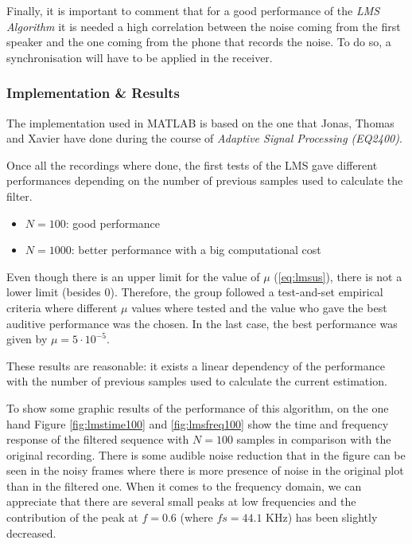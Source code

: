 \documentclass[11pt,a4paper,english]{book}  %
\theoremstyle{definition}  %
\theoremstyle{plain}  %
\theoremstyle{remark}  %
\begin{document}
		Finally, it is important to comment that for a good performance of the \textit{LMS Algorithm} it is needed a high correlation between the noise coming from the first speaker and the one coming from the phone that records the noise. To do so, a synchronisation will have to be applied in the receiver.
		
	
	\subsubsection{Implementation \& Results}
	
	The implementation used in MATLAB is based on the one that Jonas, Thomas and Xavier have done during the course of \textit{Adaptive Signal Processing (EQ2400)}.
	
	Once all the recordings where done, the first tests of the LMS gave different performances depending on the number of previous samples used to calculate the filter.
	
	\begin{itemize}
	\item $N=100$: good performance
	\item $N=1000$: better performance with a big computational cost
	\end{itemize}
	
	Even though there is an upper limit for the value of $\mu$ (\ref{eq:lmsus}), there is not a lower limit (besides $0$). Therefore, the group followed a test-and-set empirical criteria where different $\mu$ values where tested and the value who gave the best auditive performance was the chosen. In the last case, the best performance was given by $\mu=5 \cdot 10^{-5}.$
	
	These results are reasonable: it exists a linear dependency of the performance with the number of previous samples used to calculate the current estimation.
	
	To show some graphic results of the performance of this algorithm, on the one hand Figure \ref{fig:lmstime100} and \ref{fig:lmsfreq100} show the time and frequency response of the filtered sequence with $N=100$ samples in comparison with the original recording. There is some audible noise reduction that in the figure can be seen in the noisy frames where there is more presence of noise in the original plot than in the filtered one. When it comes to the frequency domain, we can appreciate that there are several small peaks at low frequencies and the contribution of the peak at $f=0.6$ (where $fs=44.1$ KHz) has been slightly decreased.
	
\end{document}
